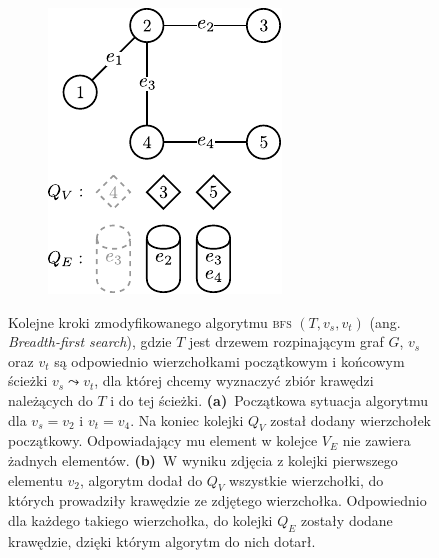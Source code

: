 \begin{savenotes}
\begin{figure}
\begin{subfigure}[b]{0.24\textwidth}
			\caption{}
			\label{fig:bfsExample:c}
		\end{subfigure}
		\hfill
		\begin{subfigure}[b]{0.24\textwidth}
			\includegraphics[width=\textwidth]{Chapter_V/BFS-example/d}
			\caption{}
			\label{fig:bfsExample:d}
		\end{subfigure}
		\hfill\null
		\caption[Kolejne kroki zmodyfikowanego algorytmu \textsc{bfs} $\left( T, v_{s}, v_{t} \right)$]{
			Kolejne kroki zmodyfikowanego algorytmu \textsc{bfs} $\left( T, v_{s}, v_{t} \right)$ (ang. \textit{Breadth-first search}), gdzie $T$ jest drzewem rozpinającym graf $G$, $v_{s}$ oraz $v_{t}$ są odpowiednio wierzchołkami początkowym i końcowym ścieżki $v_{s} \leadsto v_{t}$, dla której chcemy wyznaczyć zbiór krawędzi należących do $T$ i do tej ścieżki.
			\textbf{(a)}~Początkowa sytuacja algorytmu dla $v_{s} = v_{2}$ i $v_{t} = v_{4}$. Na koniec kolejki $Q_{V}$ został dodany wierzchołek początkowy. Odpowiadający mu element w kolejce $V_{E}$ nie zawiera żadnych elementów.
			\textbf{(b)}~W wyniku zdjęcia z kolejki pierwszego elementu $v_{2}$, algorytm dodał do $Q_{V}$ wszystkie wierzchołki, do których prowadziły krawędzie ze zdjętego wierzchołka. Odpowiednio dla każdego takiego wierzchołka, do kolejki $Q_{E}$ zostały dodane krawędzie, dzięki którym algorytm do nich dotarł.
}
\end{figure}
\end{savenotes}
